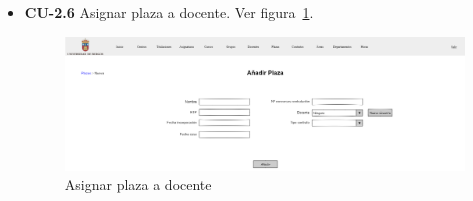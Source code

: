 \begin{itemize}
\begin{itemize}
		\FloatBarrier
		\item \textbf{CU-2.6} Asignar plaza a docente. Ver figura~\ref{F-CU2.6}.
		\begin{figure}[!h]
		\centering
		\includegraphics[width=\textwidth]{../img/Anexos/Vistas/add_plaza.png}
		\caption{Asignar plaza a docente}\label{F-CU2.6}
		\end{figure}
		\FloatBarrier
	\end{itemize}
	

\end{itemize}
